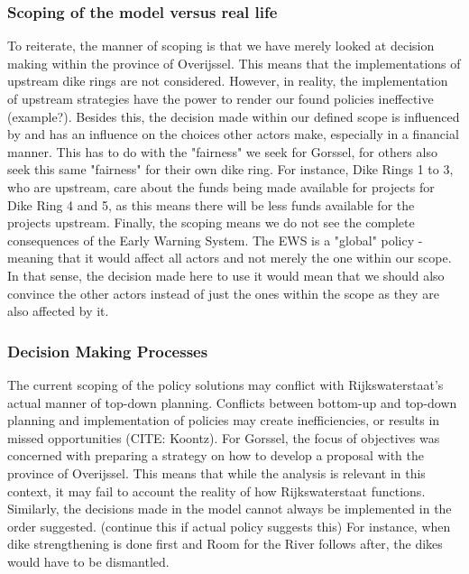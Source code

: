 \subsubsection{Scoping of the model versus real life}
To reiterate, the manner of scoping is that we have merely looked at decision making within the province of Overijssel. This means that the implementations of upstream dike rings are not considered. However, in reality, the implementation of upstream strategies have the power to render our found policies ineffective (example?). Besides this, the decision made within our defined scope is influenced by and has an influence on the choices other actors make, especially in a financial manner. This has to do with the "fairness" we seek for Gorssel, for others also seek this same "fairness" for their own dike ring. For instance, Dike Rings 1 to 3, who are upstream, care about the funds being made available for projects for Dike Ring 4 and 5, as this means there will be less funds available for the projects upstream. Finally, the scoping means we do not see the complete consequences of the Early Warning System. The EWS is a "global" policy - meaning that it would affect all actors and not merely the one within our scope. In that sense, the decision made here to use it would mean that we should also convince the other actors instead of just the ones within the scope as they are also affected by it. 

\subsubsection{Decision Making Processes}
The current scoping of the policy solutions may conflict with Rijkswaterstaat's actual manner of top-down planning. Conflicts between bottom-up and top-down planning and implementation of policies may create inefficiencies, or results in missed opportunities (CITE: Koontz). For Gorssel, the focus of objectives was concerned with preparing a strategy on how to develop a proposal with the province of Overijssel. This means that while the analysis is relevant in this context, it may fail to account the reality of how Rijkswaterstaat functions. Similarly, the decisions made in the model cannot always be implemented in the order suggested. (continue this if actual policy suggests this) For instance, when dike strengthening is done first and Room for the River follows after, the dikes would have to be dismantled. 

